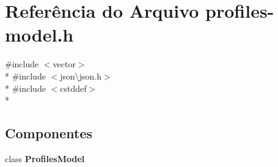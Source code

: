 \section{Referência do Arquivo profiles-\/model.h}
\label{profiles-model_8h}
{\ttfamily \#include $<$vector$>$}\\*
{\ttfamily \#include $<$json\textbackslash{}json.\+h$>$}\\*
{\ttfamily \#include $<$cstddef$>$}\\*
\subsection*{Componentes}
\begin{DoxyCompactItemize}
\item 
class {\bf Profiles\+Model}
\end{DoxyCompactItemize}

